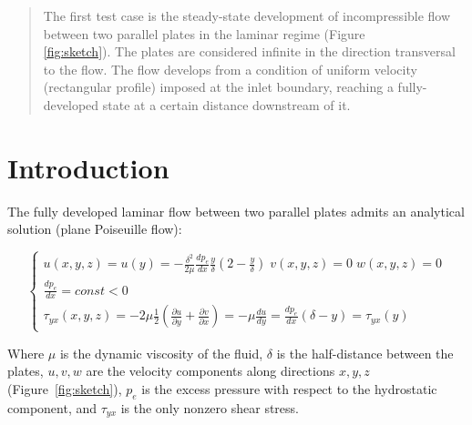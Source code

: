 \documentclass[12pt]{article}
\begin{document}
\maketitle

\begin{abstract} 
        The first test case is the steady-state development of incompressible flow between two parallel plates in the laminar regime (Figure~\\\ref{fig:sketch}). The plates are considered infinite in the direction transversal to the flow. The flow develops from a condition of uniform velocity (rectangular profile) imposed at the inlet boundary, reaching a fully-developed state at a certain distance downstream of it. \cite{FL:01}
\end{abstract}

\section{Introduction}
        The fully developed laminar flow between two parallel plates admits an analytical solution (plane Poiseuille flow):

        \begin{equation} \label{eq:system}
                \begin{cases}
                        u(x,y,z) = u(y) = - \frac{\delta ^ 2}{2 \mu} \frac{dp_e}{dx} \frac{y}{\delta} (2 - \frac{y}{\delta}) \; v(x,y,z) = 0 \; w(x,y,z) = 0 \\
                        \frac{dp_e}{dx} = const < 0 \\
                        \tau_{yx}(x,y,z) = - 2 \mu \frac{1}{2} \left( \frac{\partial u}{\partial y} + \frac{\partial v}{\partial x} \right) = - \mu \frac{du}{dy} = \frac{dp_e}{dx} (\delta - y) = \tau_{yx}(y)
                \end{cases}
        \end{equation}

        Where \( \mu \) is the dynamic viscosity of the fluid, \( \delta \) is the half-distance between the plates, \(u, v, w\) are the velocity components along directions \( x, y, z \) (Figure~\ref{fig:sketch}), \( p_e \) is the excess pressure with respect to the hydrostatic component, and \( \tau_{yx} \) is the only nonzero shear stress. \cite{FL:01}
\end{document}
